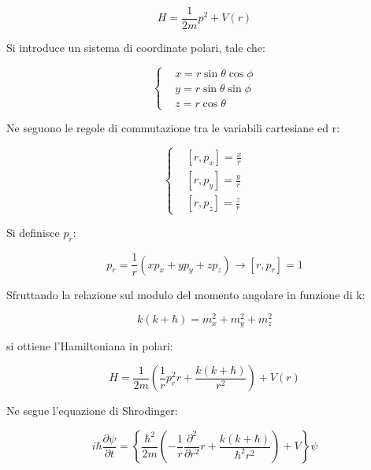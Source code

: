 \documentclass{article}
\begin{document}
\begin{equation}
    H=\frac{1}{2m}p^2+V(r)
\end{equation}

Si introduce un sistema di coordinate polari, tale che:

\begin{equation}
    \left\{
    \begin{aligned}
         & x=r\sin{\theta}\cos{\phi} \\
         & y=r\sin{\theta}\sin{\phi} \\
         & z=r\cos{\theta}
    \end{aligned}
    \right.
\end{equation}

Ne seguono le regole di commutazione tra le variabili cartesiane ed r:

\begin{equation}
    \left\{
    \begin{aligned}
         & [r, p_x]=\frac{x}{r} \\
         & [r, p_y]=\frac{y}{r} \\
         & [r, p_z]=\frac{z}{r}
    \end{aligned}
    \right.
\end{equation}

Si definisce $p_r$:

\begin{equation}
    p_r=\frac{1}{r}(xp_x+yp_y+zp_z) \rightarrow [r, p_r]=1
\end{equation}

Sfruttando la relazione sul modulo del momento angolare in funzione di k:

\begin{equation}
    k(k+\hbar)=m_x^2+m_y^2+m_z^2
\end{equation}

si ottiene l'Hamiltoniana in polari:

\begin{equation}
    H=\frac{1}{2m}\left ( \frac{1}{r}p_r^2 r +\frac{k(k+\hbar)}{r^2}\right )+V(r)
\end{equation}

Ne segue l'equazione di Shrodinger:

\begin{equation}
    i\hbar \frac{\partial \psi}{\partial t}= \left \{ \frac{\hbar^2}{2m}\left ( -\frac{1}{r}\frac{\partial^2}{\partial r^2}r+\frac{k(k+\hbar)}{\hbar^2r^2} \right ) +V \right \} \psi
\end{equation}
\end{document}
